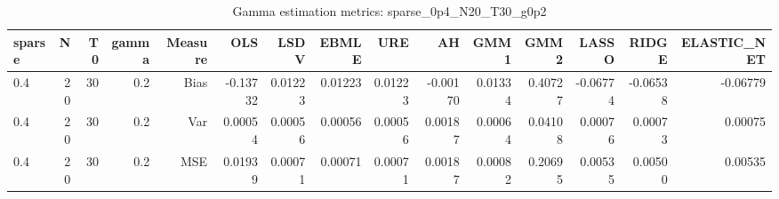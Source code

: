 \begin{table}[!htbp]\centering
\caption{Gamma estimation metrics: sparse_0p4_N20_T30_g0p2}
\label{tab:table1_sparse_0p4_N20_T30_g0p2}
\begin{tabular}{lrrrrrrrrrrrrrr}
\hline
sparse & N & T0 & gamma & Measure & OLS & LSDV & EBMLE & URE & AH & GMM1 & GMM2 & LASSO & RIDGE & ELASTIC_NET \\
\hline
0.4 & 20 & 30 & 0.2 & Bias & -0.13732 & 0.01223 & 0.01223 & 0.01223 & -0.00170 & 0.01334 & 0.40727 & -0.06774 & -0.06538 & -0.06779 \\
0.4 & 20 & 30 & 0.2 & Var & 0.00054 & 0.00056 & 0.00056 & 0.00056 & 0.00187 & 0.00064 & 0.04108 & 0.00076 & 0.00073 & 0.00075 \\
0.4 & 20 & 30 & 0.2 & MSE & 0.01939 & 0.00071 & 0.00071 & 0.00071 & 0.00187 & 0.00082 & 0.20695 & 0.00535 & 0.00500 & 0.00535 \\
\hline
\end{tabular}
\end{table}

